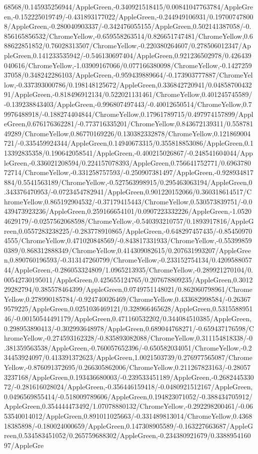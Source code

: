 {\begin{tikzternal}
68568/0.145935256944/AppleGreen,-0.340921518415/0.00841047763784/AppleGreen,-0.152225019749/-0.431893177022/AppleGreen,-0.244949106931/0.197007478008/AppleGreen,-0.280040903337/-0.342476055155/AppleGreen,0.502141387058/-0.856165856532/ChromeYellow,-0.659558263514/0.826651747481/ChromeYellow,0.688622851852/0.76028313507/ChromeYellow,-0.220380264607/0.278506012347/AppleGreen,0.141233535942/-0.546130697404/AppleGreen,0.921236502978/0.426439040616/ChromeYellow,-1.03909167066/0.077166380098/ChromeYellow,-0.142725937058/0.348242286103/AppleGreen,-0.959439889664/-0.173903777887/ChromeYellow,-0.337393000786/0.198148125672/AppleGreen,0.336842720941/0.0485870043291/AppleGreen,-0.818496912134/0.522021131461/ChromeYellow,0.401245745589/-0.139238843403/AppleGreen,-0.996807497443/-0.40012650514/ChromeYellow,0.79976488918/-0.188274404844/ChromeYellow,0.17961789715/0.497974157899/AppleGreen,0.676176362281/-0.773716335201/ChromeYellow,0.843672139311/0.55878149289/ChromeYellow,0.86770169226/0.130382332878/ChromeYellow,0.121869004721/-0.335459924344/AppleGreen,0.14940673315/0.355818853086/AppleGreen,0.113392835358/0.190642058541/AppleGreen,-0.400215026867/-0.248541604044/AppleGreen,-0.336021208594/0.224157078393/AppleGreen,0.756641752771/0.696378072714/ChromeYellow,-0.331258757593/-0.250907381497/AppleGreen,-0.928934817884/0.5541563189/ChromeYellow,-0.527563998915/0.295463063194/AppleGreen,0.343376470953/-0.0723454782941/AppleGreen,0.901220152066/0.360318614517/ChromeYellow,0.865192904532/-0.37179415443/ChromeYellow,0.530573839751/-0.0439473923236/AppleGreen,0.259166654101/0.0907223332226/AppleGreen,-1.05204629179/-0.0257562068598/ChromeYellow,-0.540393210757/0.1893917816/AppleGreen,0.0557283238225/-0.283778910865/AppleGreen,-0.648297457435/-0.854509704555/ChromeYellow,0.471020848569/-0.843817331933/ChromeYellow,-0.553998590389/0.868312888349/ChromeYellow,0.414309082615/0.207631993207/AppleGreen,0.890760196593/-0.313147260799/ChromeYellow,-0.233152754134/0.420958805744/AppleGreen,-0.286053324809/1.0965213935/ChromeYellow,-0.289921270104/0.00542730195011/AppleGreen,0.425655124765/0.207678809235/AppleGreen,0.301229282794/0.385578464399/AppleGreen,0.0749751148021/0.862060798961/ChromeYellow,0.278990185784/-0.924740026469/ChromeYellow,0.433682998584/-0.263679579225/AppleGreen,0.0251036469121/0.328966465628/AppleGreen,0.531558895146/-0.00150544491179/AppleGreen,0.471160532202/0.344084510385/AppleGreen,0.298953890413/-0.302993648978/AppleGreen,0.689044768271/-0.659437176598/ChromeYellow,-0.274593162328/-0.835893082088/ChromeYellow,0.311154818338/-0.381359563538/AppleGreen,-0.760057652396/-0.650582034051/ChromeYellow,-0.234453924097/0.413391372623/AppleGreen,1.0021503739/0.276977565087/ChromeYellow,-0.876091372695/0.266305862006/ChromeYellow,0.211267823163/-0.280573237168/AppleGreen,0.193436680003/-0.239533451189/AppleGreen,-0.268244533072/-0.281616028024/AppleGreen,-0.356446159418/-0.0480921512167/AppleGreen,0.0496569855414/-0.518009789606/AppleGreen,0.194823071052/-0.388434705912/AppleGreen,0.354444473492/1.07078880132/ChromeYellow,-0.292298200461/-0.0653540014012/AppleGreen,0.891011025663/-0.331489813014/ChromeYellow,0.436818385898/-0.180024000659/AppleGreen,0.147308905589/-0.163227663687/AppleGreen,0.534583451052/0.265759688302/AppleGreen,-0.234380921679/0.338895416097/AppleGre
\end{tikzternal}}
